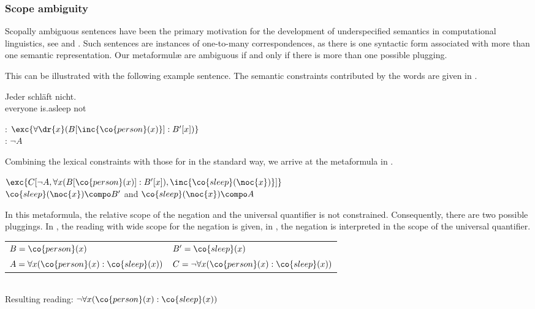 \documentclass[output=paper]{langsci/langscibook}
\begin{document}
\subsubsection{Scope ambiguity}
\label{Sec-LRS-Ambig}

Scopally ambiguous sentences have been the primary motivation for the development of underspecified semantics in computational linguistics, see \citet{Pinkal:95} and \citet{Bos:96}. 
Such sentences are instances of one-to-many correspondences, as there is one syntactic form associated with more than one semantic representation.  
Our metaformul\ae{} are ambiguous if and only if there is more than one possible plugging. 

This can be illustrated with the following example sentence. The semantic constraints contributed by the words are given in .

\ea
\gll Jeder schläft nicht.\\
everyone is.asleep not\\
\glt {}
\z 

\ea \label{every-not-le}
: $\exc{\forall \dr{x}(B[\inc{\co{person}(x)}]:B'[x])}$\\
: $\lnot A$
\z

Combining the lexical constraints with those for  in the standard way, we arrive at the metaformula in .

\ea \label{every-not-lf}
$\exc{C[\lnot A, \forall x (B[\co{person}(x)] : B'[x]), \inc{\co{sleep}(\noc{x})}]}$\\
$\co{sleep}(\noc{x}) \compo B'$
and
$\co{sleep}(\noc{x}) \compo A$
\z

In this metaformula, the relative scope of the negation and the universal quantifier is not constrained. Consequently, there are two possible pluggings. In , the reading with wide scope for the negation is given, in , the negation is interpreted in the scope of the universal quantifier.

\ea \label{every-not-plug-wide}
\begin{tabular}[t]{ll}
$B = \co{person}(x)$ & 
$B' = \co{sleep}(x)$\\
$A = \forall x (\co{person}(x): \co{sleep}(x))$ & 
$C = \lnot \forall x (\co{person}(x): \co{sleep}(x))$
\end{tabular}\\
Resulting reading: $\lnot \forall x (\co{person}(x) : \co{sleep}(x))$
\z 
\end{document}
